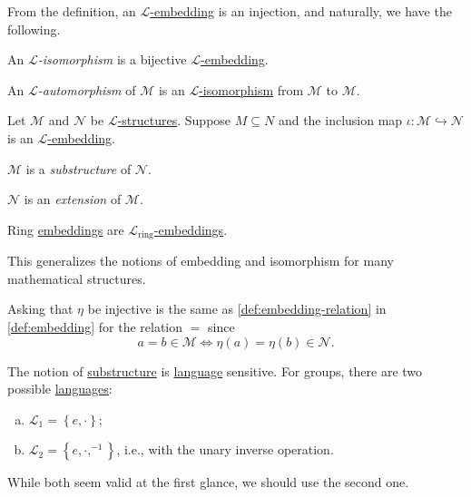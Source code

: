 From the definition, an \hyperref[def:embedding]{\(\mathcal{L} \)-embedding} is an injection, and naturally, we have the following.

\begin{definition}[Isomorphism]\label{def:isomorphism}
	An \emph{\(\mathcal{L} \)-isomorphism} is a bijective \hyperref[def:embedding]{\(\mathcal{L} \)-embedding}.
\end{definition}

\begin{definition}[Automorphism]\label{def:automorphism}
	An \emph{\(\mathcal{L} \)-automorphism} of \(\mathcal{M} \) is an \hyperref[def:isomorphism]{\(\mathcal{L} \)-isomorphism} from \(\mathcal{M} \) to \(\mathcal{M} \).
\end{definition}

\begin{definition*}
	Let \(\mathcal{M} \) and \(\mathcal{N} \) be \hyperref[def:structure]{\(\mathcal{L} \)-structures}. Suppose \(M \subseteq N\) and the inclusion map \(\iota \colon \mathcal{M} \hookrightarrow \mathcal{N} \) is an \hyperref[def:embedding]{\(\mathcal{L} \)-embedding}.

	\begin{definition}[Substructure]\label{def:substructure}
		\(\mathcal{M}\) is a \emph{substructure} of \(\mathcal{N} \).
	\end{definition}
	\begin{definition}[Extension]\label{def:extension}
		\(\mathcal{N} \) is an \emph{extension} of \(\mathcal{M} \).
	\end{definition}
\end{definition*}

\begin{eg}
	Ring \hyperref[def:embedding]{embeddings} are \hyperref[def:embedding]{\(\mathcal{L} _{\text{ring} }\)-embeddings}.
\end{eg}

This generalizes the notions of embedding and isomorphism for many mathematical structures.

\begin{remark}
	Asking that \(\eta \) be injective is the same as \autoref{def:embedding-relation} in \autoref{def:embedding} for the relation \(=\) since
	\[
		a=b \in \mathcal{M} \iff \eta (a) = \eta (b) \in \mathcal{N} .
	\]
\end{remark}

The notion of \hyperref[def:substructure]{substructure} is \hyperref[def:language]{language} sensitive. For groups, there are two possible \hyperref[def:language]{languages}:
\begin{enumerate}[(a)]
	\item \(\mathcal{L} _1 = \left\{ e, \cdot \right\} \);
	\item \(\mathcal{L} _2 = \left\{ e, \cdot, ^{-1} \right\} \), i.e., with the unary inverse operation.
\end{enumerate}
While both seem valid at the first glance, we should use the second one.

